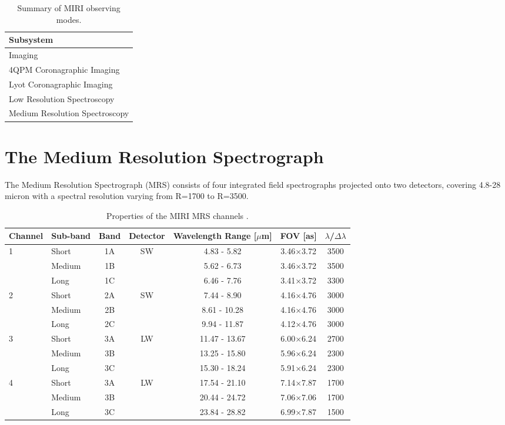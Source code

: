 \begin{table}[t]
	\begin{tabular}{l}
		\toprule
		Subsystem\\
		\midrule
		Imaging\\
		4QPM Coronagraphic Imaging\\
		Lyot Coronagraphic Imaging\\
		Low Resolution Spectroscopy\\
		Medium Resolution Spectroscopy\\
		\bottomrule
	\end{tabular}
	\caption{Summary of MIRI observing modes.}
	\label{tab:mirimodes}
\end{table}
\autocite{Kendrew2015} %
\section{The Medium Resolution Spectrograph}\label{sec:mrs}
The Medium Resolution Spectrograph (MRS) consists of four integrated field spectrographs projected onto two detectors, covering 4.8-28 micron with a spectral resolution varying from R=1700 to R=3500.
\begin{table}[t]
	\centering
	\begin{tabular}{l|lc|cccc}
		\toprule
		Channel & Sub-band & Band & Detector & Wavelength Range [$\mu$m] & FOV [as] & $\lambda$/$\Delta\lambda$\\
		\midrule
		\multirow{3}{*}{1}  &Short & 1A & \multirow{3}{*}{SW}   & 4.83 - 5.82 & 3.46$\times$3.72 & 3500 \\
							&Medium & 1B &						& 5.62 - 6.73 & 3.46$\times$3.72 & 3500 \\
							& Long & 1C&						& 6.46 - 7.76 & 3.41$\times$3.72 & 3300 \\
		\midrule
		\multirow{3}{*}{2}  &Short & 2A & \multirow{3}{*}{SW}   & 7.44 - 8.90 & 4.16$\times$4.76 & 3000 \\
							&Medium & 2B &						& 8.61 - 10.28 & 4.16$\times$4.76 & 3000 \\
							& Long & 2C&						& 9.94 - 11.87 & 4.12$\times$4.76 & 3000 \\
		\midrule
		\multirow{3}{*}{3}  &Short & 3A & \multirow{3}{*}{LW}   & 11.47 - 13.67 & 6.00$\times$6.24 & 2700 \\
							&Medium & 3B &						& 13.25 - 15.80 & 5.96$\times$6.24 & 2300 \\
							& Long & 3C&						& 15.30 - 18.24 & 5.91$\times$6.24 & 2300 \\		
		\midrule
		\multirow{3}{*}{4}  &Short & 3A & \multirow{3}{*}{LW}   & 17.54 - 21.10 & 7.14$\times$7.87 & 1700 \\
							&Medium & 3B &						& 20.44 - 24.72 & 7.06$\times$7.06 & 1700 \\
							& Long & 3C&						& 23.84 - 28.82 & 6.99$\times$7.87 & 1500 \\			
		\bottomrule
	\end{tabular}
	\caption{Properties of the MIRI MRS channels \autocite{MIRI6}.}
	\label{tab:mrs}
\end{table}
\autocite{Wells2015} %
